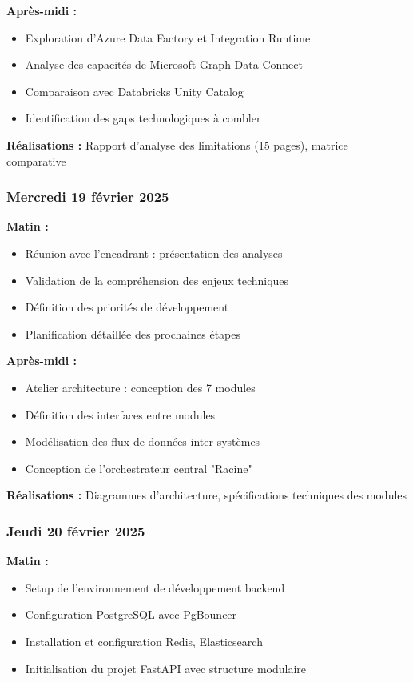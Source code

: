\documentclass[a4paper,12pt]{article}
\begin{document}
\textbf{Après-midi :}
\begin{itemize}
    \item Exploration d'Azure Data Factory et Integration Runtime
    \item Analyse des capacités de Microsoft Graph Data Connect
    \item Comparaison avec Databricks Unity Catalog
    \item Identification des gaps technologiques à combler
\end{itemize}

\textbf{Réalisations :} Rapport d'analyse des limitations (15 pages), matrice comparative

\subsubsection*{Mercredi 19 février 2025}
\textbf{Matin :}
\begin{itemize}
    \item Réunion avec l'encadrant : présentation des analyses
    \item Validation de la compréhension des enjeux techniques
    \item Définition des priorités de développement
    \item Planification détaillée des prochaines étapes
\end{itemize}

\textbf{Après-midi :}
\begin{itemize}
    \item Atelier architecture : conception des 7 modules
    \item Définition des interfaces entre modules
    \item Modélisation des flux de données inter-systèmes
    \item Conception de l'orchestrateur central "Racine"
\end{itemize}

\textbf{Réalisations :} Diagrammes d'architecture, spécifications techniques des modules

\subsubsection*{Jeudi 20 février 2025}
\textbf{Matin :}
\begin{itemize}
    \item Setup de l'environnement de développement backend
    \item Configuration PostgreSQL avec PgBouncer
    \item Installation et configuration Redis, Elasticsearch
    \item Initialisation du projet FastAPI avec structure modulaire
\end{itemize}
\end{document}
